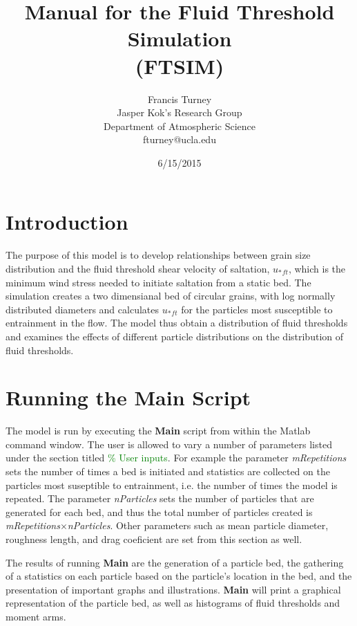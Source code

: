 \documentclass{article}
\begin{document}
\title{Manual for the Fluid Threshold Simulation \\
(FTSIM)}
\author{Francis Turney\\
Jasper Kok's Research Group\\
Department of Atmospheric Science\\
fturney@ucla.edu}
\date{6/15/2015}

\maketitle

\section*{Introduction}
	The purpose of this model is to develop relationships between grain size distribution and the fluid threshold shear velocity of saltation, ${u_{*}}_{ft}$, which is the minimum wind stress needed to initiate saltation from a static bed. The simulation creates a two dimensianal bed of circular grains, with log normally distributed diameters and calculates ${u_{*}}_{ft}$ for the particles most susceptible to entrainment in the flow. The model thus obtain a distribution of fluid thresholds and examines the effects of different particle distributions on the distribution of fluid thresholds.


\section*{Running the Main Script}
	The model is run by executing the \textbf{Main} script from within the Matlab command window. The user is allowed to vary a number of parameters listed under the section titled \textcolor{Green}{\% User inputs}. For example the parameter \textit{mRepetitions} sets the number of times a bed is initiated and statistics are collected on the particles most suseptible to entrainment, i.e. the number of times the model is repeated. The parameter \textit{nParticles} sets the number of particles that are generated for each bed, and thus the total number of particles created is \textit{mRepetitions}$\times$\textit{nParticles}. Other parameters such as mean particle diameter, roughness length, and drag coeficient are set from this section as well.
	
	
	The results of running \textbf{Main} are the generation of a particle bed, the gathering of a statistics on each particle based on the particle's location in the bed, and the presentation of important graphs and illustrations. \textbf{Main} will print a graphical representation of the particle bed, as well as histograms of fluid thresholds and moment arms.
	
\end{document}
